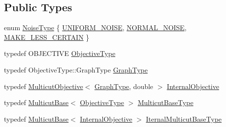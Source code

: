 \subsection*{Public Types}
\begin{DoxyCompactItemize}
\item 
enum \hyperlink{classnifty_1_1graph_1_1opt_1_1multicut_1_1PerturbAndMap_a4bd929ae1c1786dc7f8bcdf9afd06a36}{Noise\+Type} \{ \hyperlink{classnifty_1_1graph_1_1opt_1_1multicut_1_1PerturbAndMap_a4bd929ae1c1786dc7f8bcdf9afd06a36a6dd934268a793988a24fdda02c6f95b7}{U\+N\+I\+F\+O\+R\+M\+\_\+\+N\+O\+I\+SE}, 
\hyperlink{classnifty_1_1graph_1_1opt_1_1multicut_1_1PerturbAndMap_a4bd929ae1c1786dc7f8bcdf9afd06a36a167bd4d4cc3446bd22903643b58d4869}{N\+O\+R\+M\+A\+L\+\_\+\+N\+O\+I\+SE}, 
\hyperlink{classnifty_1_1graph_1_1opt_1_1multicut_1_1PerturbAndMap_a4bd929ae1c1786dc7f8bcdf9afd06a36a10b1d26f9917ba18269afe7848c352d2}{M\+A\+K\+E\+\_\+\+L\+E\+S\+S\+\_\+\+C\+E\+R\+T\+A\+IN}
 \}
\item 
typedef O\+B\+J\+E\+C\+T\+I\+VE \hyperlink{classnifty_1_1graph_1_1opt_1_1multicut_1_1PerturbAndMap_ac76585ed44501350bf31fbcc2d02078e}{Objective\+Type}
\item 
typedef Objective\+Type\+::\+Graph\+Type \hyperlink{classnifty_1_1graph_1_1opt_1_1multicut_1_1PerturbAndMap_a4284b4d29c3e770b0e107fa794b3d32e}{Graph\+Type}
\item 
typedef \hyperlink{classnifty_1_1graph_1_1opt_1_1multicut_1_1MulticutObjective}{Multicut\+Objective}$<$ \hyperlink{classnifty_1_1graph_1_1opt_1_1multicut_1_1PerturbAndMap_a4284b4d29c3e770b0e107fa794b3d32e}{Graph\+Type}, double $>$ \hyperlink{classnifty_1_1graph_1_1opt_1_1multicut_1_1PerturbAndMap_abf4a3ad796a3a06f4e488880cadc7fc9}{Internal\+Objective}
\item 
typedef \hyperlink{classnifty_1_1graph_1_1opt_1_1multicut_1_1MulticutBase}{Multicut\+Base}$<$ \hyperlink{classnifty_1_1graph_1_1opt_1_1multicut_1_1PerturbAndMap_ac76585ed44501350bf31fbcc2d02078e}{Objective\+Type} $>$ \hyperlink{classnifty_1_1graph_1_1opt_1_1multicut_1_1PerturbAndMap_ae56fa211a119f05363d2037cda512061}{Multicut\+Base\+Type}
\item 
typedef \hyperlink{classnifty_1_1graph_1_1opt_1_1multicut_1_1MulticutBase}{Multicut\+Base}$<$ \hyperlink{classnifty_1_1graph_1_1opt_1_1multicut_1_1PerturbAndMap_abf4a3ad796a3a06f4e488880cadc7fc9}{Internal\+Objective} $>$ \hyperlink{classnifty_1_1graph_1_1opt_1_1multicut_1_1PerturbAndMap_a42bd629f5bdb2d60985e551861c70a4f}{Iternal\+Multicut\+Base\+Type}
\item 

\end{DoxyCompactItemize}
